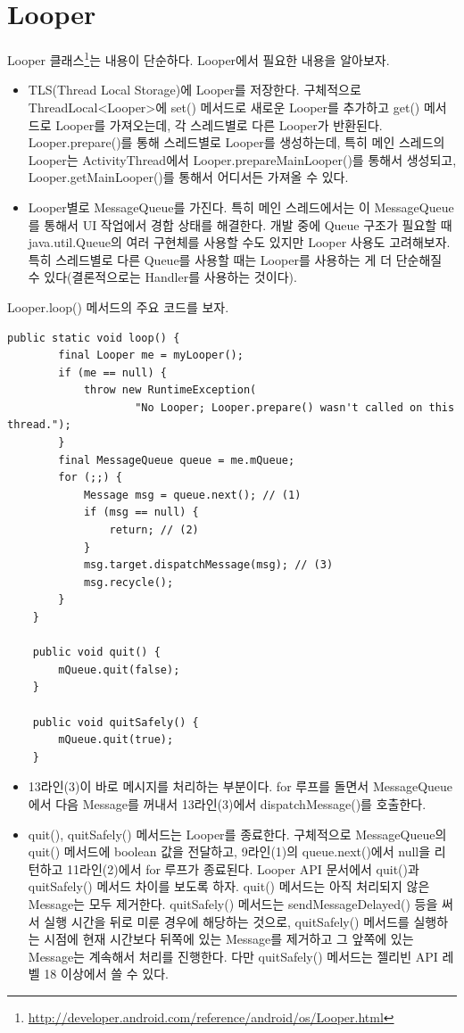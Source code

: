 \section{Looper}
Looper 클래스\footnote{\url{http://developer.android.com/reference/android/os/Looper.html}}는 내용이 단순하다. Looper에서 필요한 내용을 알아보자.
\begin{itemize}
\item TLS(Thread Local Storage)에 Looper를 저장한다. 구체적으로 ThreadLocal<Looper>에 set() 메서드로 새로운 Looper를 추가하고 get() 메서드로 Looper를 가져오는데, 각 스레드별로 다른 Looper가 반환된다.
Looper.prepare()를 통해 스레드별로 Looper를 생성하는데, 특히 메인 스레드의 Looper는 ActivityThread에서 Looper.prepareMainLooper()를 통해서 생성되고, Looper.getMainLooper()를 통해서 어디서든 가져올 수 있다.
\item Looper별로 MessageQueue를 가진다. 특히 메인 스레드에서는 이 MessageQueue를 통해서 UI 작업에서 경합 상태를 해결한다. 
개발 중에 Queue 구조가 필요할 때 java.util.Queue의 여러 구현체를 사용할 수도 있지만 Looper 사용도 고려해보자. 특히 스레드별로 다른 Queue를 사용할 때는 Looper를 사용하는 게 더 단순해질 수 있다(결론적으로는 Handler를 사용하는 것이다).
\end{itemize}

Looper.loop() 메서드의 주요 코드를 보자.
\begin{lstlisting}[frame=single, caption=Looper.java] 
	public static void loop() {
		final Looper me = myLooper();
		if (me == null) {
			throw new RuntimeException(
					"No Looper; Looper.prepare() wasn't called on this thread.");
		}
		final MessageQueue queue = me.mQueue;
		for (;;) {
			Message msg = queue.next(); // (1)
			if (msg == null) {
				return; // (2)
			}
			msg.target.dispatchMessage(msg); // (3)
			msg.recycle();
		}
	}
	
	public void quit() {
        mQueue.quit(false);
    }
    
    public void quitSafely() {
        mQueue.quit(true);
    }
\end{lstlisting}	
\begin{itemize}
\item 13라인(3)이 바로 메시지를 처리하는 부분이다. 
for 루프를 돌면서 MessageQueue에서 다음 Message를 꺼내서 13라인(3)에서 dispatchMessage()를 호출한다. 
\item quit(), quitSafely() 메서드는 Looper를 종료한다. 구체적으로 MessageQueue의 quit() 메서드에 boolean 값을 전달하고, 9라인(1)의 queue.next()에서 null을 리턴하고 11라인(2)에서 for 루프가 종료된다.
Looper API 문서에서 quit()과 quitSafely() 메서드 차이를 보도록 하자.
quit() 메서드는 아직 처리되지 않은 Message는 모두 제거한다.
quitSafely() 메서드는 sendMessageDelayed() 등을 써서 실행 시간을 뒤로 미룬 경우에 해당하는 것으로, quitSafely() 메서드를 실행하는 시점에 현재 시간보다 뒤쪽에 있는 Message를 제거하고 그 앞쪽에 있는 Message는 계속해서 처리를 진행한다. 다만 quitSafely() 메서드는 젤리빈 API 레벨 18 이상에서 쓸 수 있다.\\
\end{itemize}

